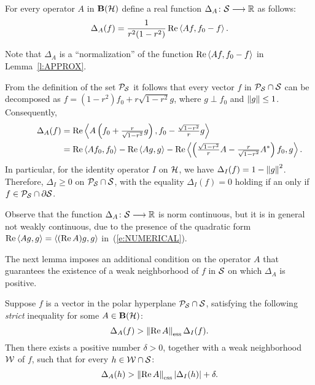 \smallskip

\begin{defn}
For every operator $A$ in $\mathbf B(\cal H)$ define a real function
$\Delta_A\colon{\cal S}\longrightarrow\mathbb R$ as follows:
\[ \Delta_A(f) = \frac{1}{r^2(1-r^2)}\operatorname{Re}\left<A{}f, f_0-f\right>. \]
\end{defn}

\begin{rem}
Note that $\Delta_A$ is a ``normalization'' of the function $\operatorname{Re}\left<A{}f,
f_0-f\right>$ in Lemma~\ref{l:APPROX}.

From the definition of the set ${\cal P}_{{\cal S}}$ it follows that every vector $f$ in
${\cal P}_{{\cal S}}\cap{\cal S}$ can be decomposed as $f=(1-r^2)f_0 + r\sqrt{1-r^2} g$, where
$g \perp f_0$ and $\left\Vert g\right\Vert\leq 1$. Consequently,
\begin{equation}\label{e:NUMERICAL}
  \begin{split}
   ~~ \quad ~~
   \Delta_A(f) &= \RE\seq{A\left(f_0+\tfrac{r}{\sqrt{1-r^2}}g\right),
                        f_0-\tfrac{\sqrt{1-r^2}}{r}g}\\
             &= \RE\seq{A f_0, f_0} - \RE\seq{A g, g} -
                \RE\seq{\left(\tfrac{\sqrt{1-r^2}}{r}A
                             -\tfrac{r}{\sqrt{1-r^2}}A^*\right) f_0, g}.
  \end{split}
\end{equation}
In particular, for the identity operator $I$ on ${\cal H}$, we have $\Delta_I(f) =
1 - \left\Vert g\right\Vert^2$. Therefore, $\Delta_I\geq0$ on ${\cal P}_{{\cal S}}\cap{\cal S}$, with the
equality $\Delta_I(f)=0$ holding if an only if $f\in{\cal P}_{{\cal S}}\cap\partial{\cal S}$.

Observe that the function $\Delta_A\colon{\cal S}\longrightarrow\mathbb R$ is norm continuous, but
it is in general not weakly continuous, due to the presence of the quadratic
form $\operatorname{Re}\left<A g,g\right> = \left<(\operatorname{Re}{A})g, g\right>$ in~(\ref{e:NUMERICAL}).
\end{rem}

\smallskip

The next lemma imposes an additional condition on the operator $A$ that
guarantees the existence of a weak neighborhood of $f$ in ${\cal S}$ on which
$\Delta_A$ is positive.

\begin{lem} \label{l:ESS}
Suppose $f$ is a vector in the polar hyperplane ${\cal P}_{{\cal S}}\cap{\cal S}$, satisfying
the following {\em strict} inequality for some $A \in \mathbf B(\cal H)$:
\[ \Delta_A(f) > \essnorm{\RE{}A} \Delta_I(f). \]
Then there exists a positive number $\delta>0$, together with a weak
neighborhood ${\cal W}$ of $f$, such that for every $h\in{\cal W}\cap{\cal S}$:
\[ \Delta_A(h) > \essnorm{\RE{}A}\abs{\Delta_I(h)} + \delta. \]
\end{lem}

